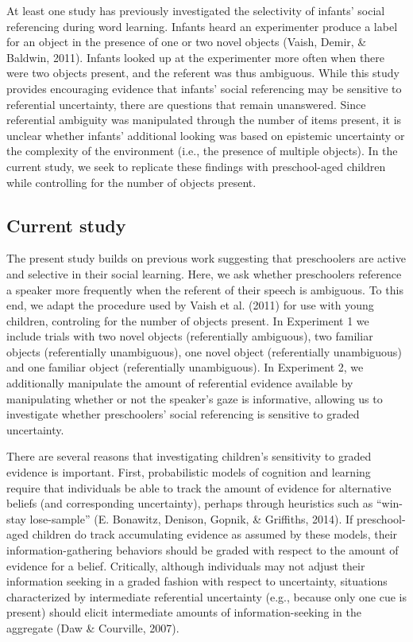 \documentclass[a4paper,man,apacite,floatsintext]{apa6}
\begin{document}
At least one study has previously investigated the selectivity of
infants' social referencing during word learning. Infants heard an
experimenter produce a label for an object in the presence of one or two
novel objects (Vaish, Demir, \& Baldwin, 2011). Infants looked up at the
experimenter more often when there were two objects present, and the
referent was thus ambiguous. While this study provides encouraging
evidence that infants' social referencing may be sensitive to
referential uncertainty, there are questions that remain unanswered.
Since referential ambiguity was manipulated through the number of items
present, it is unclear whether infants' additional looking was based on
epistemic uncertainty or the complexity of the environment (i.e., the
presence of multiple objects). In the current study, we seek to
replicate these findings with preschool-aged children while controlling
for the number of objects present.

\subsection{Current study}\label{current-study}

The present study builds on previous work suggesting that preschoolers
are active and selective in their social learning. Here, we ask whether
preschoolers reference a speaker more frequently when the referent of
their speech is ambiguous. To this end, we adapt the procedure used by
Vaish et al. (2011) for use with young children, controling for the
number of objects present. In Experiment 1 we include trials with two
novel objects (referentially ambiguous), two familiar objects
(referentially unambiguous), one novel object (referentially
unambiguous) and one familiar object (referentially unambiguous). In
Experiment 2, we additionally manipulate the amount of referential
evidence available by manipulating whether or not the speaker's gaze is
informative, allowing us to investigate whether preschoolers' social
referencing is sensitive to graded uncertainty.

There are several reasons that investigating children's sensitivity to
graded evidence is important. First, probabilistic models of cognition
and learning require that individuals be able to track the amount of
evidence for alternative beliefs (and corresponding uncertainty),
perhaps through heuristics such as ``win-stay lose-sample'' (E.
Bonawitz, Denison, Gopnik, \& Griffiths, 2014). If preschool-aged
children do track accumulating evidence as assumed by these models,
their information-gathering behaviors should be graded with respect to
the amount of evidence for a belief. Critically, although individuals
may not adjust their information seeking in a graded fashion with
respect to uncertainty, situations characterized by intermediate
referential uncertainty (e.g., because only one cue is present) should
elicit intermediate amounts of information-seeking in the aggregate (Daw
\& Courville, 2007).
\end{document}
